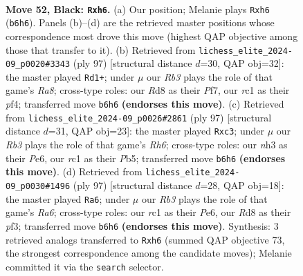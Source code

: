 \documentclass[11pt]{article}
\begin{document}
\clearpage

\begin{figure}[p]\centering
\begin{subfigure}{0.46\textwidth}\centering
\resizebox{\linewidth}{!}{%
\newchessgame
\chessboard[
  setfen={3r4/4kp2/1r5P/p7/3pK3/1P5N/1R5P/2R5 b - - 0 52},
  showmover=false,
  pgfstyle=straightmove, color=movearrow, markmove={b6-h6}
]}
\caption{}
\end{subfigure}\hfill
\begin{subfigure}{0.46\textwidth}\centering
\resizebox{\linewidth}{!}{%
\newchessgame
\chessboard[
  setfen={R7/P2K1pk1/4p3/8/5PPp/7P/8/r7 b - - 8 49},
  showmover=false,
  pgfstyle=straightmove, color=movearrow, markmove={a1-d1}
]}
\caption{}
\end{subfigure}
\\[4pt]
\begin{subfigure}{0.46\textwidth}\centering
\resizebox{\linewidth}{!}{%
\newchessgame
\chessboard[
  setfen={7R/1p3p2/4pk1P/1p6/1P6/2P4r/6K1/8 b - - 0 49},
  showmover=false,
  pgfstyle=straightmove, color=movearrow, markmove={h3-c3}
]}
\caption{}
\end{subfigure}\hfill
\begin{subfigure}{0.46\textwidth}\centering
\resizebox{\linewidth}{!}{%
\newchessgame
\chessboard[
  setfen={R7/P4pk1/4p3/6p1/8/r4PPP/1K6/8 b - - 10 49},
  showmover=false,
  pgfstyle=straightmove, color=movearrow, markmove={a3-a6}
]}
\caption{}
\end{subfigure}
\caption{\textbf{Move 52, Black: \texttt{Rxh6}.} (a) Our position; Melanie plays \texttt{Rxh6} (\texttt{b6h6}). Panels (b)--(d) are the retrieved master positions whose correspondence most drove this move (highest QAP objective among those that transfer to it). (b) Retrieved from \texttt{lichess\_elite\_2024-09\_p0020\#3343} (ply 97) [structural distance $d$=30, QAP obj=32]: the master played \texttt{Rd1+}; under $\mu$ our \emph{Rb3} plays the role of that game's \emph{Ra8}; cross-type roles: our \emph{R}d8 as their \emph{P}f7, our \emph{r}c1 as their \emph{p}f4; transferred move \texttt{b6h6} \textbf{(endorses this move)}. (c) Retrieved from \texttt{lichess\_elite\_2024-09\_p0026\#2861} (ply 97) [structural distance $d$=31, QAP obj=23]: the master played \texttt{Rxc3}; under $\mu$ our \emph{Rb3} plays the role of that game's \emph{Rh6}; cross-type roles: our \emph{n}h3 as their \emph{P}e6, our \emph{r}c1 as their \emph{P}b5; transferred move \texttt{b6h6} \textbf{(endorses this move)}. (d) Retrieved from \texttt{lichess\_elite\_2024-09\_p0030\#1496} (ply 97) [structural distance $d$=28, QAP obj=18]: the master played \texttt{Ra6}; under $\mu$ our \emph{Rb3} plays the role of that game's \emph{Ra6}; cross-type roles: our \emph{r}c1 as their \emph{P}e6, our \emph{R}d8 as their \emph{p}f3; transferred move \texttt{b6h6} \textbf{(endorses this move)}. Synthesis: 3 retrieved analogs transferred to \texttt{Rxh6} (summed QAP objective 73, the strongest correspondence among the candidate moves); Melanie committed it via the \texttt{search} selector.}
\label{fig:thought-m103}
\end{figure}
\end{document}
